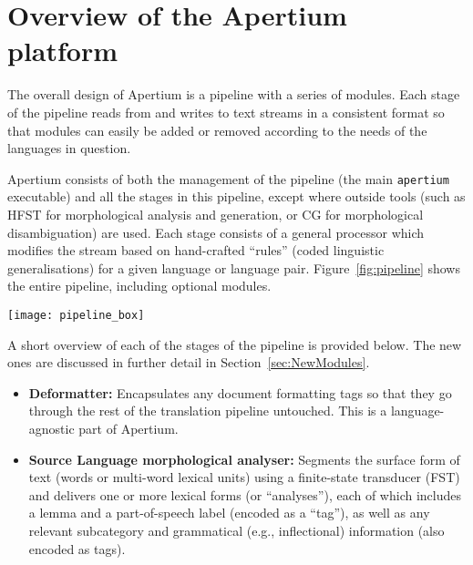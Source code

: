 \documentclass[free]{flammie}
\begin{document}
\section{Overview of the Apertium platform}\label{sec:ApertiumOV}

The overall design of Apertium is a pipeline with a series of modules. Each
stage of the pipeline reads from and writes to text streams in a consistent
format so that modules can easily be added or removed according to the needs of
the languages in question.

Apertium consists of both the management of the pipeline (the main
\texttt{apertium} executable) and all the stages in this pipeline, except where
outside tools (such as HFST for morphological analysis and generation, or CG for
morphological disambiguation) are used. Each stage consists of a general
processor which modifies the stream based on hand-crafted ``rules'' (coded
linguistic generalisations) for a given language or language pair.
Figure~\ref{fig:pipeline} shows the entire pipeline, including optional modules.

\begin{figure*}
    \centering
    \texttt{[image: pipeline\_box]}
    \caption{The architecture of Apertium, a transfer-based machine translation
    system.  Each rounded box is a module available for language-specific or
    pair-specific development.  Broken lines show optional modules.  Lines with
    arrows represent the flow of data through the pipeline.  The stages in the
    pipeline are grouped by whether they are relevant to source-language
    analysis, bilingual transfer, or target-language generation---the three
    logical sections of the pipeline.  The deformatter and reformatter are
    language-agnostic and provided by Apertium.}\label{fig:pipeline}
\end{figure*}

A short overview of each of the stages of the pipeline is provided below.  The
new ones are discussed in further detail in Section~\ref{sec:NewModules}.

\begin{itemize}
    \item[$-$]\textbf{Deformatter:} Encapsulates any document formatting tags so
        that they go through the rest of the translation pipeline untouched.
        This is a language-agnostic part of Apertium.
\end{itemize}

\begin{itemize}
    \item[$-$]\textbf{Source Language morphological analyser:} Segments the
        surface form of text (words or multi-word lexical units) using a
        finite-state transducer (FST) and delivers one or more lexical forms (or
        ``analyses''), each of which includes a lemma and a part-of-speech label
        (encoded as a ``tag''), as well as any relevant subcategory and
        grammatical (e.g., inflectional) information (also encoded as tags).
\end{itemize}
\end{document}
